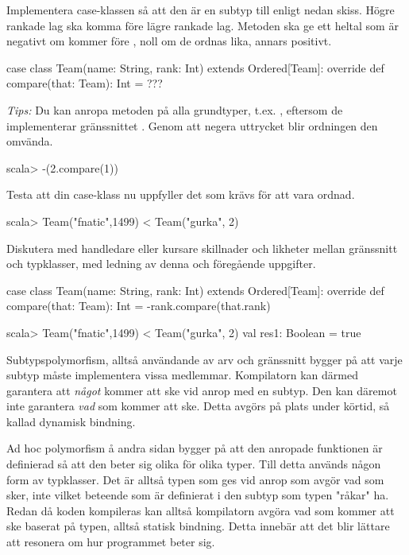 \Subtask Implementera case-klassen  så att den är en subtyp till  enligt nedan skiss. Högre rankade lag ska komma före lägre rankade lag. Metoden  ska ge ett heltal som är negativt om  kommer före , noll om de ordnas lika, annars positivt.

\begin{Code}
case class Team(name: String, rank: Int) extends Ordered[Team]:
  override def compare(that: Team): Int = ???
\end{Code}
\emph{Tips:} Du kan anropa metoden  på alla grundtyper, t.ex. , eftersom de implementerar gränssnittet . Genom att negera uttrycket blir ordningen den omvända. 

\begin{REPLnonum}
scala> -(2.compare(1))
\end{REPLnonum}

\Subtask Testa att  din case-klass nu uppfyller det som krävs för att vara ordnad.
\begin{REPLnonum}
scala> Team("fnatic",1499) < Team("gurka", 2)
\end{REPLnonum}


\Subtask Diskutera med handledare eller kursare skillnader och likheter mellan gränssnitt och typklasser, med ledning av denna och föregående uppgifter.
\SOLUTION


\TaskSolved \what

\SubtaskSolved

\begin{Code}
case class Team(name: String, rank: Int) extends Ordered[Team]:
  override def compare(that: Team): Int = -rank.compare(that.rank)
\end{Code}

\SubtaskSolved

\begin{REPLnonum}
scala> Team("fnatic",1499) < Team("gurka", 2)
val res1: Boolean = true
\end{REPLnonum}

\SubtaskSolved
Subtypspolymorfism, alltså användande av arv och gränssnitt  bygger på att varje subtyp måste implementera vissa medlemmar. 
Kompilatorn kan därmed garantera att \emph{något} kommer att ske vid anrop med en subtyp.
Den kan däremot inte garantera \emph{vad} som kommer att ske. Detta avgörs på plats under körtid,
så kallad dynamisk bindning.

Ad hoc polymorfism å andra sidan bygger på att den anropade funktionen är definierad 
så att den beter sig olika för olika typer. Till detta används någon form av typklasser.
Det är alltså typen som ges vid anrop som avgör vad som sker, 
inte vilket beteende som är definierat i den subtyp som typen "råkar" ha.
Redan då koden kompileras kan alltså kompilatorn avgöra vad som kommer att ske baserat på
typen, alltså statisk bindning. Detta innebär att det blir lättare att resonera om
hur programmet beter sig.

